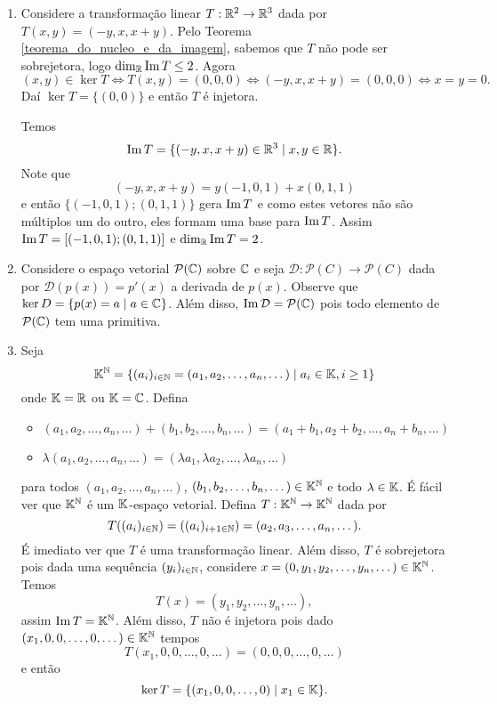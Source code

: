 \begin{exemplos}
	\begin{enumerate}
		\item Considere a transformação linear $T : \mathbb{R}^2 \to \mathbb{R}^3$ dada por $T(x,y) = (-y, x, x+y)$. Pelo Teorema \ref{teorema_do_nucleo_e_da_imagem}, sabemos que $T$ não pode ser sobrejetora, logo $\dim_{\mathbb{R}}{\rm Im\,} T \le 2$. Agora
		\[
			(x,y) \in \ker T \Leftrightarrow T(x,y) = (0,0,0) \Leftrightarrow (-y,x,x+y) = (0,0,0) \Leftrightarrow x = y = 0.
		\]
		Daí $\ker T = \{(0,0)\}$ e então $T$ é injetora.

		Temos
		\[
			{\rm Im\,} T = \{(-y,x,x+y) \in \mathbb{R}^3 \mid x, y \in \mathbb{R}\}.
		\]
		Note que
		\[
			(-y,x,x+y) = y(-1,0,1) + x(0,1,1)
		\]
		e então $\{(-1,0,1);(0,1,1)\}$ gera ${\rm Im\,} T$ e como estes vetores não são múltiplos um do outro, eles formam uma base para ${\rm Im\,} T$. Assim ${\rm Im\,} T = [(-1,0,1);(0,1,1)]$ e $\dim_{\mathbb{R}}{\rm Im\,} T = 2$.

		\item Considere o espaço vetorial $\mathcal{P}(\mathbb{C})$ sobre $\mathbb{C}$ e seja $\mathcal{D} : \mathcal{P}(C) \to \mathcal{P}(C)$ dada por $\mathcal{D}(p(x)) = p'(x)$ a derivada de $p(x)$. Observe que $\ker D = \{p(x) = a \mid a \in \mathbb{C}\}$. Além disso, ${\rm Im\,} \mathcal{D} = \mathcal{P}(\mathbb{C})$ pois todo elemento de $\mathcal{P}(\mathbb{C})$ tem uma primitiva.

		\item Seja
		\[
			\mathbb{K}^{\mathbb{N}} = \{(a_i)_{i \in \mathbb{N}} = (a_1, a_2, \dots, a_n, \dots) \mid a_i \in \mathbb{K}, i \ge 1\}
		\]
		onde $\mathbb{K} = \mathbb{R}$ ou $\mathbb{K} = \mathbb{C}$. Defina
		\begin{itemize}
			\item $(a_1,a_2,\dots,a_n,\dots) + (b_1,b_2,\dots,b_n,\dots) = (a_1+b_1,a_2+b_2,\dots,a_n+b_n,\dots)$

			\item $\lambda(a_1,a_2,\dots,a_n,\dots) = (\lambda a_1,\lambda a_2,\dots,\lambda a_n,\dots)$
		\end{itemize}
		para todos $(a_1,a_2,\dots,a_n,\dots)$, $(b_1,b_2,\dots,b_n,\dots) \in \mathbb{K}^{\mathbb{N}}$ e todo $\lambda \in \mathbb{K}$. É fácil ver que $\mathbb{K}^{\mathbb{N}}$ é um $\mathbb{K}$-espaço vetorial. Defina $T : \mathbb{K}^{\mathbb{N}} \to \mathbb{K}^{\mathbb{N}}$ dada por
		\[
			T((a_i)_{i\in\mathbb{N}}) = ((a_i)_{i+1\in\mathbb{N}}) = (a_2,a_3,\dots,a_n,\dots).
		\]
		É imediato ver que $T$ é uma transformação linear. Além disso, $T$ é sobrejetora pois dada uma sequência $(y_i)_{i\in\mathbb{N}}$, considere $x = (0,y_1,y_2,\dots,y_n,\dots) \in \mathbb{K}^{\mathbb{N}}$. Temos
		\[
			T(x) = (y_1,y_2,\dots,y_n,\dots),
		\]
		assim ${\rm Im\,} T = \mathbb{K}^{\mathbb{N}}$. Além disso, $T$ não é injetora pois dado $(x_1,0,0,\dots,0,\dots) \in \mathbb{K}^{\mathbb{N}}$ tempos
		\[
			T(x_1,0,0,\dots,0,\dots) = (0,0,0,\dots,0,\dots)
		\]
		e então
		\[
			\ker T = \{(x_1,0,0,\dots,0) \mid x_1 \in \mathbb{K}\}.
		\]
	\end{enumerate}
\end{exemplos}


